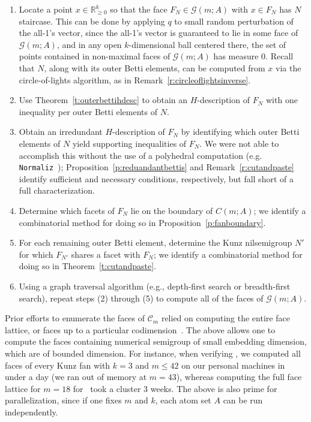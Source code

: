 \documentclass[ALCO, Unicode]{cedram}
\newcommand\RR{\mathbb{R}}
\newcommand\cC{{\mathcal C}}
\begin{document}
\begin{enumerate}[(1)]
\item 
Locate a point $x \in \RR_{\ge 0}^k$ so that the face $F_N \in \mathcal G(m; A)$ with $x \in F_N$ has $N$ staircase.  This can be done by applying $q$ to small random perturbation of the all-1's vector, since the all-1's vector is guaranteed to lie in some face of $\mathcal G(m; A)$, and in any open $k$-dimensional ball centered there, the set of points contained in non-maximal faces of $\mathcal G(m; A)$ has measure 0.  Recall that $N$, along with its outer Betti elements, can be computed from $x$ via the circle-of-lights algorithm, as in Remark~\ref{r:circleoflightsinverse}.  

\item 
Use Theorem~\ref{t:outerbettihdesc} to obtain an $H$-description of $F_N$ with one inequality per outer Betti elements of $N$.  

\item 
Obtain an irredundant $H$-description of $F_N$ by identifying which outer Betti elements of $N$ yield supporting inequalities of $F_N$.  We were not able to accomplish this without the use of a polyhedral computation (e.g. \texttt{Normaliz}~\cite{normaliz3}); Proposition~\ref{p:reduandantbettis} and Remark~\ref{r:cutandpaste} identify sufficient and necessary conditions, respectively, but fall short of a full characterization.  

\item 
Determine which facets of $F_N$ lie on the boundary of $C(m; A)$; we identify a combinatorial method for doing so in Proposition~\ref{p:fanboundary}.  

\item 
For each remaining outer Betti element, determine the Kunz nilsemigroup $N'$ for which $F_{N'}$ shares a facet with $F_N$; we identify a combinatorial method for doing so in Theorem~\ref{t:cutandpaste}.  

\item 
Using a graph traversal algorithm (e.g., depth-first search or breadth-first search), repeat steps (2) through (5) to compute all of the faces of $\mathcal G(m; A)$.  

\end{enumerate}

Prior efforts to enumerate the faces of $\cC_m$ relied on computing the entire face lattice, or faces up to a particular codimension~\cite{wilfmultiplicity}.  The above allows one to compute the faces containing numerical semigroup of small embedding dimension, which are of bounded dimension.  
For instance, when verifying \cite[Conjecture~7.1]{minprescard}, we computed all faces of every Kunz fan with $k = 3$ and $m \le 42$ on our personal machines in under a day (we ran out of memory at $m = 43$), whereas computing the full face lattice for $m = 18$ for~\cite{wilfmultiplicity} took a cluster 3 weeks.  The above is also prime for parallelization, since if one fixes $m$ and $k$, each atom set $A$ can be run independently.  
\end{document}
